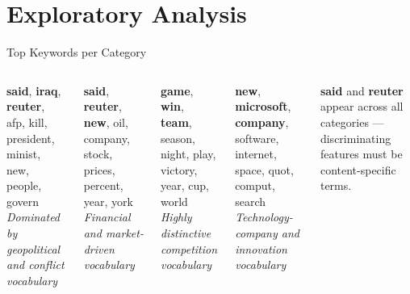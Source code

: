 \documentclass[aspectratio=169,11pt]{beamer}
\begin{document}
\section{Exploratory Analysis}

\begin{frame}{Top Keywords per Category}
\begin{columns}[T]
    \begin{tcolorbox}[colback=worldcol!8,colframe=worldcol,title=World --- Top Terms,fonttitle=\footnotesize\bfseries]
      \footnotesize
      \textbf{said}, \textbf{iraq}, \textbf{reuter}, afp, kill, president, minist, new, people, govern\\[3pt]
      \textit{\scriptsize Dominated by geopolitical and conflict vocabulary}
    \end{tcolorbox}
    \vspace{4pt}
    \begin{tcolorbox}[colback=businesscol!8,colframe=businesscol,title=Business --- Top Terms,fonttitle=\footnotesize\bfseries]
      \footnotesize
      \textbf{said}, \textbf{reuter}, \textbf{new}, oil, company, stock, prices, percent, year, york\\[3pt]
      \textit{\scriptsize Financial and market-driven vocabulary}
    \end{tcolorbox}
    \begin{tcolorbox}[colback=sportscol!8,colframe=sportscol,title=Sports --- Top Terms,fonttitle=\footnotesize\bfseries]
      \footnotesize
      \textbf{game}, \textbf{win}, \textbf{team}, season, night, play, victory, year, cup, world\\[3pt]
      \textit{\scriptsize Highly distinctive competition vocabulary}
    \end{tcolorbox}
    \vspace{4pt}
    \begin{tcolorbox}[colback=scitechcol!8,colframe=scitechcol,title=Sci/Tech --- Top Terms,fonttitle=\footnotesize\bfseries]
      \footnotesize
      \textbf{new}, \textbf{microsoft}, \textbf{company}, software, internet, space, quot, comput, search\\[3pt]
      \textit{\scriptsize Technology-company and innovation vocabulary}
    \end{tcolorbox}
    \vspace{4pt}
    \begin{tcolorbox}[colback=accent!8,colframe=accent,fonttitle=\footnotesize\bfseries,title=Key Observation]
      \scriptsize
      \textbf{said} and \textbf{reuter} appear across all categories --- discriminating features must be content-specific terms.
    \end{tcolorbox}
\end{columns}
\end{frame}
\end{document}
